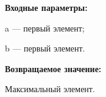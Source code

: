 \textbf{Входные параметры:}

 a --- первый элемент;
	
 b --- первый элемент.


\textbf{Возвращаемое значение:}

Максимальный элемент.